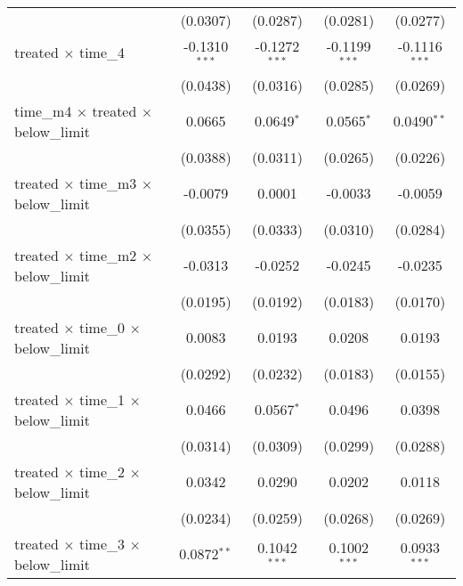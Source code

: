 \begin{tabular}{lcccc}
                                                       & (0.0307)        & (0.0287)        & (0.0281)        & (0.0277)\\   
   treated $\times$ time\_4                            & -0.1310$^{***}$ & -0.1272$^{***}$ & -0.1199$^{***}$ & -0.1116$^{***}$\\   
                                                       & (0.0438)        & (0.0316)        & (0.0285)        & (0.0269)\\   
   time\_m4 $\times$ treated $\times$ below\_limit     & 0.0665          & 0.0649$^{*}$    & 0.0565$^{*}$    & 0.0490$^{**}$\\   
                                                       & (0.0388)        & (0.0311)        & (0.0265)        & (0.0226)\\   
   treated $\times$ time\_m3 $\times$ below\_limit     & -0.0079         & 0.0001          & -0.0033         & -0.0059\\   
                                                       & (0.0355)        & (0.0333)        & (0.0310)        & (0.0284)\\   
   treated $\times$ time\_m2 $\times$ below\_limit     & -0.0313         & -0.0252         & -0.0245         & -0.0235\\   
                                                       & (0.0195)        & (0.0192)        & (0.0183)        & (0.0170)\\   
   treated $\times$ time\_0 $\times$ below\_limit      & 0.0083          & 0.0193          & 0.0208          & 0.0193\\   
                                                       & (0.0292)        & (0.0232)        & (0.0183)        & (0.0155)\\   
   treated $\times$ time\_1 $\times$ below\_limit      & 0.0466          & 0.0567$^{*}$    & 0.0496          & 0.0398\\   
                                                       & (0.0314)        & (0.0309)        & (0.0299)        & (0.0288)\\   
   treated $\times$ time\_2 $\times$ below\_limit      & 0.0342          & 0.0290          & 0.0202          & 0.0118\\   
                                                       & (0.0234)        & (0.0259)        & (0.0268)        & (0.0269)\\   
   treated $\times$ time\_3 $\times$ below\_limit      & 0.0872$^{**}$   & 0.1042$^{***}$  & 0.1002$^{***}$  & 0.0933$^{***}$\\   

\end{tabular}
